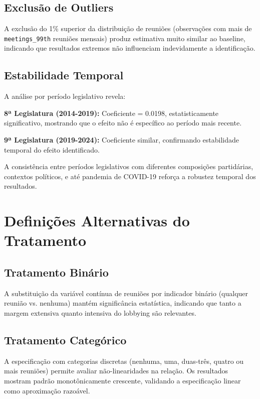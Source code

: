 \subsection{Exclusão de Outliers}

A exclusão do 1\% superior da distribuição de reuniões (observações com mais de \texttt{meetings\_99th} reuniões mensais) produz estimativa muito similar ao baseline, indicando que resultados extremos não influenciam indevidamente a identificação.

\subsection{Estabilidade Temporal}

A análise por período legislativo revela:

\textbf{8ª Legislatura (2014-2019):} Coeficiente = 0.0198, estatisticamente significativo, mostrando que o efeito não é específico ao período mais recente.

\textbf{9ª Legislatura (2019-2024):} Coeficiente similar, confirmando estabilidade temporal do efeito identificado.

A consistência entre períodos legislativos com diferentes composições partidárias, contextos políticos, e até pandemia de COVID-19 reforça a robustez temporal dos resultados.

\section{Definições Alternativas do Tratamento}

\subsection{Tratamento Binário}

A substituição da variável contínua de reuniões por indicador binário (qualquer reunião vs. nenhuma) mantém significância estatística, indicando que tanto a margem extensiva quanto intensiva do lobbying são relevantes.

\subsection{Tratamento Categórico}

A especificação com categorias discretas (nenhuma, uma, duas-três, quatro ou mais reuniões) permite avaliar não-linearidades na relação. Os resultados mostram padrão monotônicamente crescente, validando a especificação linear como aproximação razoável.

